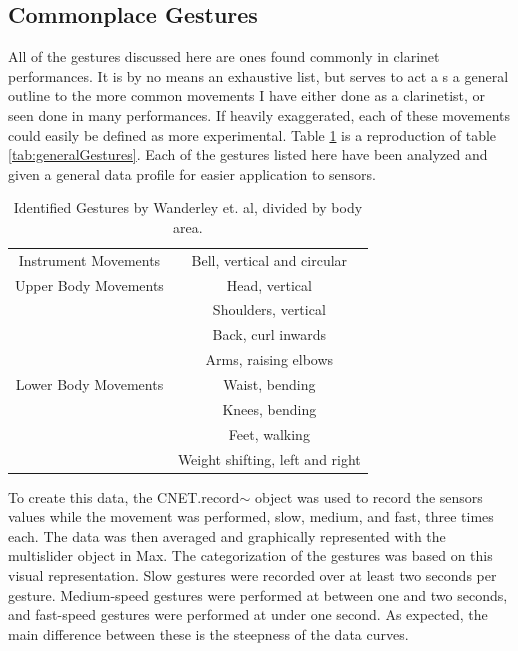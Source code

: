 \subsection{Commonplace Gestures}
All of the gestures discussed here are ones found commonly in clarinet performances. It is by no means an exhaustive list, but serves to act a s a general outline to the more common movements I have either done as a clarinetist, or seen done in many performances. If heavily exaggerated, each of these movements could easily be defined as more experimental. Table \ref{tab:generalGestures2} is a reproduction of table \ref{tab:generalGestures}. Each of the gestures listed here have been analyzed and given a general data profile for easier application to sensors.


\begin{table}[]
    \centering
    \begin{tabular}{c|c}
       Instrument Movements  & Bell, vertical and circular \\
        Upper Body Movements & Head, vertical \\
        & Shoulders, vertical \\
        & Back, curl inwards \\
        & Arms, raising elbows \\
        Lower Body Movements & Waist, bending \\
        & Knees, bending \\
        & Feet, walking \\
        & Weight shifting, left and right
    \end{tabular}
    \caption{Identified Gestures by Wanderley et. al\cite{wanderleyClarinetGesture2005}, divided by body area.}
    \label{tab:generalGestures2}
\end{table}

To create this data, the CNET.record$\sim$ object was used to record the sensors values while the movement was performed, slow, medium, and fast, three times each. The data was then averaged and graphically represented with the multislider object in Max. The categorization of the gestures was based on this visual representation. Slow gestures were recorded over at least two seconds per gesture. Medium-speed gestures were performed at between one and two seconds, and fast-speed gestures were performed at under one second. As expected, the main difference between these is the steepness of the data curves.


